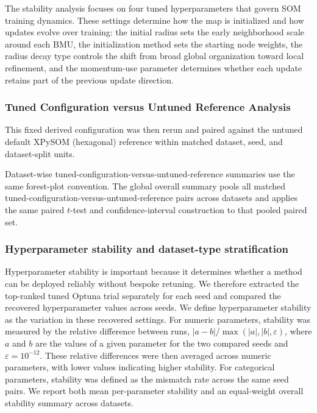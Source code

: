 \documentclass[10pt]{article} %
\begin{document}
The stability analysis focuses on four tuned hyperparameters that govern SOM training dynamics. These settings determine how the map is initialized and how updates evolve over training: the initial radius sets the early neighborhood scale around each BMU, the initialization method sets the starting node weights, the radius decay type controls the shift from broad global organization toward local refinement, and the momentum-use parameter determines whether each update retains part of the previous update direction.

\subsubsection{Tuned Configuration versus Untuned Reference Analysis}

This fixed derived configuration was then rerun and paired against the untuned default XPySOM (hexagonal) reference within matched dataset, seed, and dataset-split units.

Dataset-wise tuned-configuration-versus-untuned-reference summaries use the same forest-plot convention. The global overall summary pools all matched tuned-configuration-versus-untuned-reference pairs across datasets and applies the same paired $t$-test and confidence-interval construction to that pooled paired set.

\subsubsection{Hyperparameter stability and dataset-type stratification}

Hyperparameter stability is important because it determines whether a method can be deployed reliably without bespoke retuning. We therefore extracted the top-ranked tuned Optuna trial separately for each seed and compared the recovered hyperparameter values across seeds. We define hyperparameter stability as the variation in these recovered settings. For numeric parameters, stability was measured by the relative difference between runs, $|a-b| / \max(|a|,|b|,\varepsilon)$, where $a$ and $b$ are the values of a given parameter for the two compared seeds and $\varepsilon=10^{-12}$. These relative differences were then averaged across numeric parameters, with lower values indicating higher stability. For categorical parameters, stability was defined as the mismatch rate across the same seed pairs. We report both mean per-parameter stability and an equal-weight overall stability summary across datasets.
\end{document}
